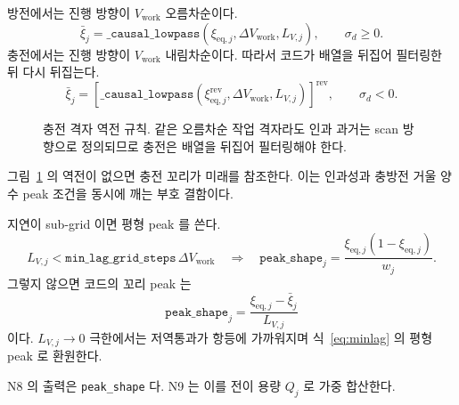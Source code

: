 \documentclass[11pt,a4paper]{article}
\newcommand{\eq}{\mathrm{eq}}
\newcommand{\work}{\mathrm{work}}
\begin{document}
방전에서는 진행 방향이 $V_{\work}$ 오름차순이다.
\begin{equation}
\bar\xi_j=\texttt{\_causal\_lowpass}(\xi_{\eq,j},\Delta V_{\work},L_{V,j}),\qquad \sigma_d\ge0.
\label{eq:dislowpass}
\end{equation}
충전에서는 진행 방향이 $V_{\work}$ 내림차순이다. 따라서 코드가 배열을 뒤집어 필터링한 뒤 다시 뒤집는다.
\begin{equation}
\bar\xi_j=
\left[\texttt{\_causal\_lowpass}(\xi_{\eq,j}^{\mathrm{rev}},\Delta V_{\work},L_{V,j})\right]^{\mathrm{rev}},
\qquad \sigma_d<0.
\label{eq:chglowpass}
\end{equation}

\begin{figure}[t]
\centering
{}
\caption{충전 격자 역전 규칙. 같은 오름차순 작업 격자라도 인과 과거는 scan 방향으로 정의되므로 충전은 배열을 뒤집어 필터링해야 한다.}
\label{fig:tailreverse}
\end{figure}

그림~\ref{fig:tailreverse} 의 역전이 없으면 충전 꼬리가 미래를 참조한다. 이는 인과성과 충방전 거울 양수 peak 조건을 동시에 깨는 부호 결함이다.

지연이 sub-grid 이면 평형 peak 를 쓴다.
\begin{equation}
L_{V,j}<\texttt{min\_lag\_grid\_steps}\,\Delta V_{\work}
\quad\Longrightarrow\quad
\texttt{peak\_shape}_j=\frac{\xi_{\eq,j}(1-\xi_{\eq,j})}{w_j}.
\label{eq:minlag}
\end{equation}
그렇지 않으면 코드의 꼬리 peak 는
\begin{equation}
\boxed{\;\texttt{peak\_shape}_j=\frac{\xi_{\eq,j}-\bar\xi_j}{L_{V,j}}\;}
\label{eq:tailshape}
\end{equation}
이다. $L_{V,j}\to0$ 극한에서는 저역통과가 항등에 가까워지며 식~\eqref{eq:minlag} 의 평형 peak 로 환원한다.

N8 의 출력은 \texttt{peak\_shape} 다. N9 는 이를 전이 용량 $Q_j$ 로 가중 합산한다.
\end{document}
